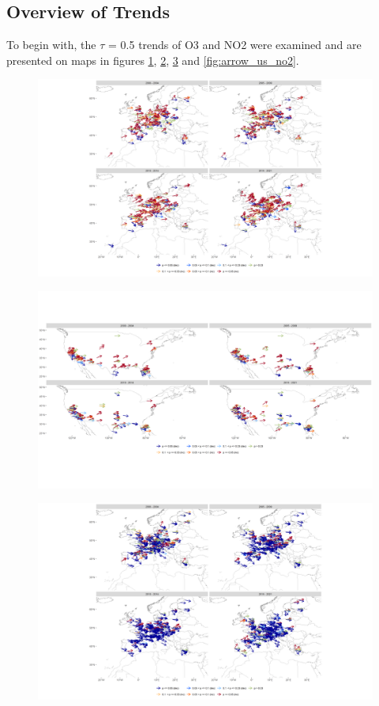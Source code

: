 \documentclass[journal abbreviation, manuscript]{copernicus}
\begin{document}
\subsection{Overview of Trends}
To begin with, the $\tau$ = 0.5 trends of O3 and NO2 were examined and are presented on maps in figures \ref{fig:arrow_eu_o3}, \ref{fig:arrow_us_o3}, \ref{fig:arrow_eu_no2} and \ref{fig:arrow_us_no2}.

\begin{figure}[htbp]
\includegraphics[width=12cm]{plots/arrow_maps/o3/11/EU_map_spc_o3_tau_0.5_seg_11_14.png}
\caption{}
\label{fig:arrow_eu_o3}
\end{figure}

\begin{figure}[htbp]
\includegraphics[width=12cm]{plots/arrow_maps/o3/11/US_map_spc_o3_tau_0.5_seg_11_14.png}
\caption{}
\label{fig:arrow_us_o3}
\end{figure}

\begin{figure}[htbp]
\includegraphics[width=12cm]{plots/arrow_maps/no2/11/EU_map_spc_no2_tau_0.5_seg_11_14.png}
\caption{}
\label{fig:arrow_eu_no2}
\end{figure}
\end{document}
